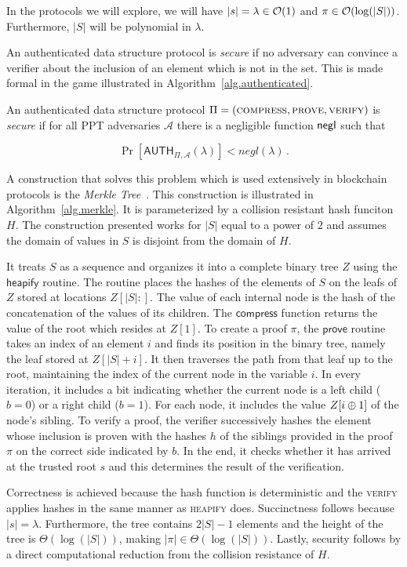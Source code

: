 In the protocols we will explore, we will have $|s| = \lambda \in \mathcal{O}(1)$ and
$\pi \in \mathcal{O}(\log(|S|))$. Furthermore, $|S|$ will be polynomial in $\lambda$.

An authenticated data structure protocol is \emph{secure} if no adversary can
convince a verifier about the inclusion of an element which is not in the
set. This is made formal in the game illustrated in
Algorithm~\ref{alg.authenticated}.



\begin{definition}[Security]
  An authenticated data structure protocol $\Pi = (\textsc{compress},\allowbreak \textsc{prove},\allowbreak \textsc{verify})$ is \emph{secure} if for all PPT adversaries $\mathcal{A}$
  there is a negligible function $\mathsf{negl}$ such that

  \[
    \Pr[\textsf{AUTH}_{\Pi,\mathcal{A}}(\lambda)] < negl(\lambda)\,.
  \]
\end{definition}

A construction that solves this problem which is used extensively in blockchain
protocols is the \emph{Merkle Tree}~\cite{merkle}. This construction is
illustrated in Algorithm~\ref{alg.merkle}. It is parameterized by a collision
resistant hash funciton $H$. The construction presented works for $|S|$ equal to
a power of $2$ and assumes the domain of values in $S$ is disjoint from the
domain of $H$.



It treats $S$ as a sequence and organizes it into a complete binary tree $Z$
using the $\textsf{heapify}$ routine. The routine places the hashes of the
elements of $S$ on the leafs of $Z$ stored at locations $Z[|S|{:}]$. The value
of each internal node is the hash of the concatenation of the values of its
children. The $\textsf{compress}$ function returns the value of the root which
resides at $Z[1]$. To create a proof $\pi$, the $\textsf{prove}$ routine takes
an index of an element $i$ and finds its position in the binary tree, namely the
leaf stored at $Z[|S| + i]$. It then traverses the path from that leaf up to the
root, maintaining the index of the current node in the variable $i$. In every
iteration, it includes a bit indicating whether the current node is a left child
($b = 0$) or a right child ($b = 1$). For each node, it includes the value $Z[i
\oplus 1]$ of the node's sibling. To verify a proof, the verifier successively
hashes the element whose inclusion is proven with the hashes $h$ of the siblings
provided in the proof $\pi$ on the correct side indicated by $b$. In the end, it
checks whether it has arrived at the trusted root $s$ and this determines the
result of the verification.

Correctness is achieved because the hash function is deterministic and the
\textsc{verify} applies hashes in the same manner as \textsc{heapify} does.
Succinctness follows because $|s| = \lambda$. Furthermore, the tree contains
$2|S| - 1$ elements and the height of the tree is $\Theta(\log(|S|))$, making
$|\pi| \in \Theta(\log(|S|))$. Lastly, security follows by a direct
computational reduction from the collision resistance of $H$.
